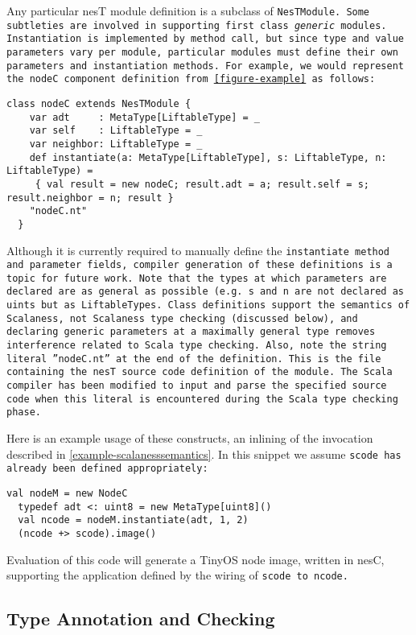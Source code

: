 Any particular nesT module definition is a subclass of \tt{NesTModule}. Some subtleties are
involved in supporting first class \emph{generic} modules. Instantiation is implemented by
method call, but since type and value parameters vary per module, particular modules must define
their own parameters and instantiation methods. For example, we would represent the \tt{nodeC}
component definition from \autoref{figure-example} as follows:
\begin{Verbatim}[fontfamily=cmtt,fontsize=\scriptsize]
  class nodeC extends NesTModule {
    var adt     : MetaType[LiftableType] = _
    var self    : LiftableType = _
    var neighbor: LiftableType = _
    def instantiate(a: MetaType[LiftableType], s: LiftableType, n: LiftableType) =
     { val result = new nodeC; result.adt = a; result.self = s; result.neighbor = n; result }
    "nodeC.nt"
  }
\end{Verbatim}
Although it is currently required to manually define the \tt{instantiate} method and parameter
fields, compiler generation of these definitions is a topic for future work. Note that the types
at which parameters are declared are as general as possible (e.g.~\tt{s} and \tt{n} are not
declared as \tt{uint}s but as \tt{LiftableType}s. Class definitions support the semantics of
Scalaness, not Scalaness type checking (discussed below), and declaring generic parameters at a
maximally general type removes interference related to Scala type checking. Also, note the
string literal \tt{''nodeC.nt''} at the end of the definition. This is the file containing the
nesT source code definition of the module. The Scala compiler has been modified to input and
parse the specified source code when this literal is encountered during the Scala type checking
phase.

Here is an example usage of these constructs, an inlining of the invocation described in
\autoref{example-scalanesssemantics}. In this snippet we assume \tt{scode} has already been
defined appropriately:
\begin{Verbatim}[fontfamily=cmtt,fontsize=\scriptsize]
  val nodeM = new NodeC
  typedef adt <: uint8 = new MetaType[uint8]()
  val ncode = nodeM.instantiate(adt, 1, 2)
  (ncode +> scode).image()
\end{Verbatim}
Evaluation of this code will generate a TinyOS node image, written in nesC, supporting the
application defined by the wiring of \tt{scode} to \tt{ncode}.

\subsection{Type Annotation and Checking}

